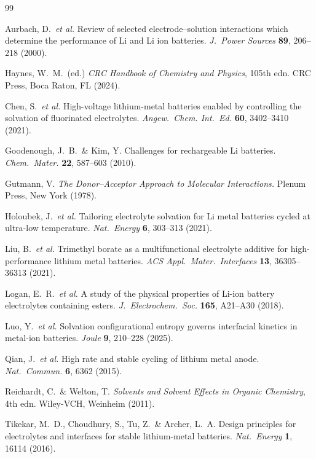 \documentclass[11pt]{article}
\theoremstyle{plain}
\theoremstyle{definition}
\theoremstyle{remark}
\begin{document}
\begin{thebibliography}{99}

Aurbach, D.\ \textit{et al.}
Review of selected electrode--solution interactions which determine
the performance of Li and Li ion batteries.
\textit{J.\ Power Sources} \textbf{89}, 206--218 (2000).

Haynes, W.\ M.\ (ed.)
\textit{CRC Handbook of Chemistry and Physics}, 105th edn.
CRC Press, Boca Raton, FL (2024).

Chen, S.\ \textit{et al.}
High-voltage lithium-metal batteries enabled by controlling the
solvation of fluorinated electrolytes.
\textit{Angew.\ Chem. Int.\ Ed.} \textbf{60}, 3402--3410 (2021).

Goodenough, J.\ B.\ \& Kim, Y.
Challenges for rechargeable Li batteries.
\textit{Chem.\ Mater.} \textbf{22}, 587--603 (2010).

Gutmann, V.
\textit{The Donor--Acceptor Approach to Molecular Interactions.}
Plenum Press, New York (1978).

Holoubek, J.\ \textit{et al.}
Tailoring electrolyte solvation for Li metal batteries cycled at
ultra-low temperature.
\textit{Nat.\ Energy} \textbf{6}, 303--313 (2021).

Liu, B.\ \textit{et al.}
Trimethyl borate as a multifunctional electrolyte additive for
high-performance lithium metal batteries.
\textit{ACS Appl.\ Mater.\ Interfaces} \textbf{13}, 36305--36313 (2021).

Logan, E.\ R.\ \textit{et al.}
A study of the physical properties of Li-ion battery electrolytes
containing esters.
\textit{J.\ Electrochem.\ Soc.} \textbf{165}, A21--A30 (2018).

Luo, Y.\ \textit{et al.}
Solvation configurational entropy governs interfacial kinetics in
metal-ion batteries.
\textit{Joule} \textbf{9}, 210--228 (2025).

Qian, J.\ \textit{et al.}
High rate and stable cycling of lithium metal anode.
\textit{Nat.\ Commun.} \textbf{6}, 6362 (2015).

Reichardt, C.\ \& Welton, T.
\textit{Solvents and Solvent Effects in Organic Chemistry}, 4th edn.
Wiley-VCH, Weinheim (2011).

Tikekar, M.\ D., Choudhury, S., Tu, Z.\ \& Archer, L.\ A.
Design principles for electrolytes and interfaces for stable
lithium-metal batteries.
\textit{Nat.\ Energy} \textbf{1}, 16114 (2016).


\end{thebibliography}
\end{document}

